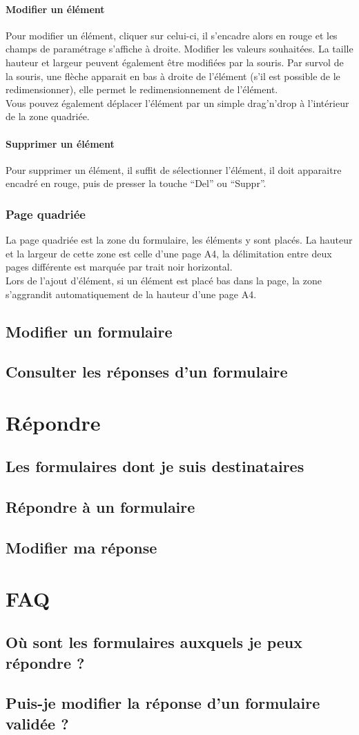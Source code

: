 \documentclass[a4paper,11pt,final]{report}
\begin{document}
\subsubsection{Modifier un élément}
Pour modifier un élément, cliquer sur celui-ci, il s'encadre alors en rouge et les champs de paramétrage s'affiche à droite. Modifier les valeurs souhaitées. La taille hauteur et largeur peuvent également être modifiées par la souris. Par survol de la souris, une flèche apparait en bas à droite de l'élément (s'il est possible de le redimensionner), elle permet le redimensionnement de l'élément.\\
Vous pouvez également déplacer l'élément par un simple drag'n'drop à l'intérieur de la zone quadriée.

\subsubsection{Supprimer un élément}
Pour supprimer un élément, il suffit de sélectionner l'élément, il doit apparaitre encadré en rouge, puis de presser la touche ``Del'' ou ``Suppr''.

\subsection{Page quadriée}
La page quadriée est la zone du formulaire, les éléments y sont placés. La hauteur et la largeur de cette zone est celle d'une page A4, la délimitation entre deux pages différente est marquée par trait noir horizontal.\\
Lors de l'ajout d'élément, si un élément est placé bas dans la page, la zone s'aggrandit automatiquement de la hauteur d'une page A4. 


\section{Modifier un formulaire}
\section{Consulter les réponses d'un formulaire}

\chapter{Répondre}
\section{Les formulaires dont je suis destinataires}
\section{Répondre à un formulaire}
\section{Modifier ma réponse}


\chapter{FAQ}
\section{Où sont les formulaires auxquels je peux répondre ?}
\section{Puis-je modifier la réponse d'un formulaire validée ?}
\end{document}
